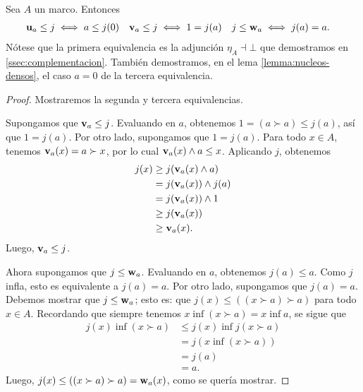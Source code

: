 \begin{lemma}
  \label{lemma:tres-equivalencias}
  Sea $A$ un marco.
  Entonces
  \begin{align*}
    \mathbf u_{a}\leq j &\iff a\leq j(0) &
    \mathbf v_{a}\leq j &\iff 1=j(a) &
    j\leq \mathbf w_{a} &\iff j(a)=a.
  \end{align*}
  Nótese que la primera equivalencia es la adjunción $\eta_A\dashv\bot$
  que demostramos en \ref{ssec:complementacion}.
  También demostramos, en el lema \ref{lemma:nucleos-densos},
  el caso $a=0$ de la tercera equivalencia.
\end{lemma}
\begin{proof}
    Mostraremos la segunda y tercera equivalencias.
    
    Supongamos que $\mathbf v_{a}\leq j$.
    Evaluando en $a$, obtenemos $1=(a\succ a)\leq j(a)$,
    así que $1=j(a)$.
    Por otro lado, supongamos que $1=j(a)$.
    Para todo $x\in A$, tenemos $\mathbf v_{a}(x)=a\succ x$,
    por lo cual $\mathbf v_{a}(x)\wedge a\leq x$.
    Aplicando $j$, obtenemos
    \begin{align*}
        j(x)
        &\geq j(\mathbf v_{a}(x)\wedge a) \\
        &= j(\mathbf v_{a}(x))\wedge j(a) \\
        &= j(\mathbf v_{a}(x))\wedge 1 \\
        &\geq j(\mathbf v_{a}(x)) \\
        &\geq \mathbf v_{a}(x).
    \end{align*}
    Luego, $\mathbf v_{a}\leq j$.
    
    Ahora supongamos que $j\leq\mathbf w_{a}$.
    Evaluando en $a$, obtenemos $j(a)\leq a$.
    Como $j$ infla, esto es equivalente a $j(a)=a$.
    Por otro lado, supongamos que $j(a)=a$.
    Debemos mostrar que $j\leq\mathbf w_{a}$;
    esto es: que $j(x)\leq((x\succ a)\succ a)$
    para todo $x\in A$.
    Recordando que siempre tenemos $x\inf(x\succ a)=x\inf a$,
    se sigue que
    \begin{align*}
        j(x)\inf(x\succ a)
        &\leq j(x)\inf j(x\succ a) \\
        &= j(x\inf (x\succ a)) \\
        &= j(a) \\
        &= a.
    \end{align*}
    Luego, $j(x)\leq((x\succ a)\succ a)=\mathbf w_{a}(x)$,
    como se quería mostrar.
\end{proof}

